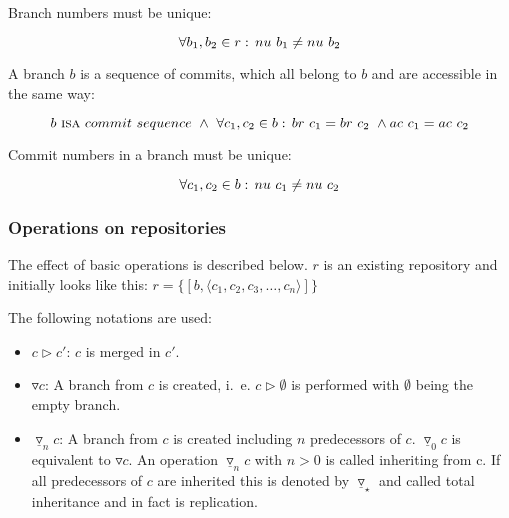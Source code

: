 \documentclass[fleqn, 10pt, a4paper]{article}
\begin{document}
Branch numbers must be unique:

\begin{displaymath}
\forall b_1, b_2 \in r:\, \mathnormal{nu}\ b_1 \neq \mathnormal{nu}\ b_2
\end{displaymath}

A branch $b$ is a sequence of commits, which all belong to
$b$ and are accessible in the same way:

\begin{displaymath}
b\ \mbox{\textsc{isa}}\ \mathnormal{commit}\ \mathnormal{sequence}\ \wedge\
\forall c_1, c_2 \in b:\, \mathnormal{br}\ c_1 = \mathnormal{br}\ c_2\ \wedge
\mathnormal{ac}\ c_1 = \mathnormal{ac}\ c_2
\end{displaymath}

Commit numbers in a branch must be unique:

\begin{displaymath}
\forall c_1, c_2 \in b:\, \mathnormal{nu}\ c_1 \neq
\mathnormal{nu}\ c_2
\end{displaymath}

\subsubsection{Operations on repositories}

The effect of basic operations is described below. $r$ is an
existing repository and initially looks like this:
$r = \{[b, \langle c_1, c_2, c_3, \ldots, c_n\rangle]\}$

The following notations are used:

\begin{itemize}
\item $c \rhd c'$: $c$ is merged in $c'$.
\item $\triangledown c$: A branch from $c$ is created, i.~e. $c \rhd \emptyset$
is performed with $\emptyset$ being the empty branch.
\item $\underline\triangledown_n c$: A branch from $c$ is created including $n$
predecessors of $c$. $\underline\triangledown_0 c$ is equivalent to
$\triangledown c$.
An operation $\underline\triangledown_n c$ with $n>0$ is called inheriting from c.
If all predecessors of $c$ are inherited this is denoted
by $\underline\triangledown_\star$
and called total inheritance and in fact is replication.
\end{itemize}
\end{document}
